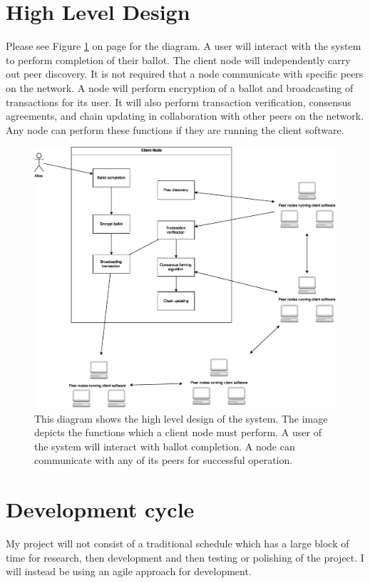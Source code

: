 \documentclass[a4paper,12pt]{article}
\begin{document}
\section{High Level Design}
Please see Figure \ref{fig:high-level-design} on page \pageref{fig:high-level-design} for the diagram. A user will interact with the system to perform completion of their ballot. The client node will independently carry out peer discovery. It is not required that a node communicate with specific peers on the network. A node will perform encryption of a ballot and broadcasting of transactions for its user. It will also perform transaction verification, consensus agreements, and chain updating in collaboration with other peers on the network. Any node can perform these functions if they are running the client software.

\begin{figure}[ht]
\centering
\includegraphics[width=\textwidth]{HighLevelDesign.eps}
\caption{This diagram shows the high level design of the system. The image depicts the functions which a client node must perform. A user of the system will interact with ballot completion. A node can communicate with any of its peers for successful operation.}
\label{fig:high-level-design}
\end{figure}

\section{Development cycle}
My project will not consist of a traditional schedule which has a large block of time for research, then development and then testing or polishing of the project. I will instead be using an agile approach for development.
\end{document}
